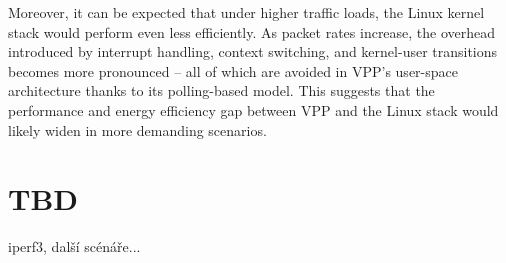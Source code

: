 Moreover, it can be expected that under higher traffic loads, the Linux kernel stack would perform even less efficiently. 
As packet rates increase, the overhead introduced by interrupt handling, context switching, and kernel-user transitions becomes more pronounced -- all of which are avoided in VPP's user-space architecture
thanks to its polling-based model. This suggests that the performance and energy efficiency gap between VPP and the Linux stack would likely widen in more demanding scenarios.

\section{TBD}
iperf3, další scénáře...



